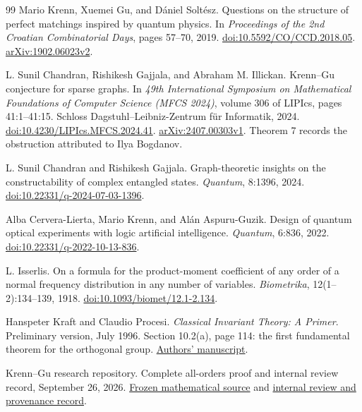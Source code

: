 \documentclass[11pt]{article}
\theoremstyle{definition}
\theoremstyle{plain}
\numberwithin{equation}{section}
\begin{document}
\begin{thebibliography}{99}
Mario Krenn, Xuemei Gu, and D\'aniel Solt\'esz.
Questions on the structure of perfect matchings inspired by quantum physics.
In \emph{Proceedings of the 2nd Croatian Combinatorial Days}, pages 57--70, 2019.
\href{https://doi.org/10.5592/CO/CCD.2018.05}{doi:10.5592/CO/CCD.2018.05}.
\href{https://arxiv.org/abs/1902.06023v2}{arXiv:1902.06023v2}.

L. Sunil Chandran, Rishikesh Gajjala, and Abraham M. Illickan.
Krenn--Gu conjecture for sparse graphs.
In \emph{49th International Symposium on Mathematical Foundations of Computer
Science (MFCS 2024)}, volume 306 of LIPIcs, pages 41:1--41:15.
Schloss Dagstuhl--Leibniz-Zentrum f\"ur Informatik, 2024.
\href{https://doi.org/10.4230/LIPIcs.MFCS.2024.41}{doi:10.4230/LIPIcs.MFCS.2024.41}.
\href{https://arxiv.org/abs/2407.00303v1}{arXiv:2407.00303v1}.
Theorem 7 records the obstruction attributed to Ilya Bogdanov.

L. Sunil Chandran and Rishikesh Gajjala.
Graph-theoretic insights on the constructability of complex entangled states.
\emph{Quantum}, 8:1396, 2024.
\href{https://doi.org/10.22331/q-2024-07-03-1396}{doi:10.22331/q-2024-07-03-1396}.

Alba Cervera-Lierta, Mario Krenn, and Al\'an Aspuru-Guzik.
Design of quantum optical experiments with logic artificial intelligence.
\emph{Quantum}, 6:836, 2022.
\href{https://doi.org/10.22331/q-2022-10-13-836}{doi:10.22331/q-2022-10-13-836}.

L. Isserlis.
On a formula for the product-moment coefficient of any order of a normal
frequency distribution in any number of variables.
\emph{Biometrika}, 12(1--2):134--139, 1918.
\href{https://doi.org/10.1093/biomet/12.1-2.134}{doi:10.1093/biomet/12.1-2.134}.

Hanspeter Kraft and Claudio Procesi.
\emph{Classical Invariant Theory: A Primer}.
Preliminary version, July 1996.
Section 10.2(a), page 114: the first fundamental theorem for the orthogonal group.
\href{https://dmi.unibas.ch/fileadmin/user_upload/dmi/Personen/Kraft_Hanspeter/Classical_Invariant_Theory.pdf}{Authors' manuscript}.

Krenn--Gu research repository.
Complete all-orders proof and internal review record, September 26, 2026.
\href{https://github.com/rrajasek95/krenn-conjecture/blob/e66211d22978927f1c761997472fa9f5cf8f9421/proofs/krenn-gu-all-orders-two-replica-proof.md}{Frozen mathematical source} and
\href{https://github.com/rrajasek95/krenn-conjecture/blob/e66211d22978927f1c761997472fa9f5cf8f9421/notes/all-orders-two-replica-review-2026-09-26.md}{internal review and provenance record}.


\end{thebibliography}
\end{document}
